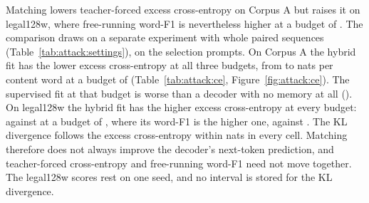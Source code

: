 Matching lowers teacher-forced excess cross-entropy on Corpus A but raises it on legal128w, where free-running word-F1 is nevertheless higher at a budget of .
The comparison draws on a separate experiment with whole paired sequences (Table~\ref{tab:attack:settings}), on the selection prompts.
On Corpus A the hybrid fit has the lower excess cross-entropy at all three budgets, from  to  nats per content word at a budget of  (Table~\ref{tab:attack:ce}, Figure~\ref{fig:attack:ce}). %
The supervised fit at that budget is worse than a decoder with no memory at all (). %
On legal128w the hybrid fit has the higher excess cross-entropy at every budget:  against  at a budget of , where its word-F1 is the higher one,  against . %
The KL divergence follows the excess cross-entropy within  nats in every cell.
Matching therefore does not always improve the decoder's next-token prediction, and teacher-forced cross-entropy and free-running word-F1 need not move together.
The legal128w scores rest on one seed, and no interval is stored for the KL divergence.

